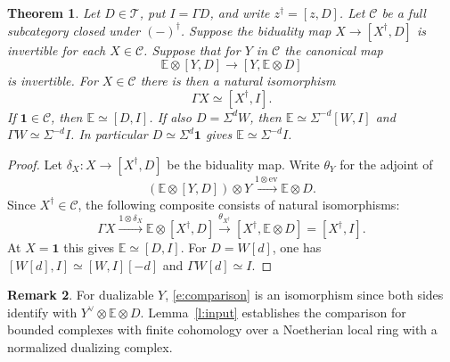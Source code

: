 \documentclass[11pt,reqno]{amsart}
\newtheorem{theorem}{Theorem}[section]
\theoremstyle{definition}
\newtheorem{remark}[theorem]{Remark}
\newcommand{\T}{\mathcal T}
\newcommand{\one}{\mathbf 1}
\numberwithin{equation}{section}
\begin{document}
\begin{theorem}\label{t:duals}
Let $D\in\T$, put $I=\Gamma D$, and write $z^\dagger=[z,D]$. Let $\mathcal C$ be a full subcategory closed under $(-)^\dagger$. Suppose the biduality map $X\to[X^\dagger,D]$ is invertible for each $X\in\mathcal C$. Suppose that for $Y$ in $\mathcal C$ the canonical map
\begin{equation}\label{e:comparison}
 \mathbb{E}\otimes[Y,D]\longrightarrow [Y,\mathbb{E}\otimes D]
\end{equation}
is invertible. For $X\in\mathcal C$ there is then a natural isomorphism
\begin{equation}\label{e:dual}
 \Gamma X\simeq[X^\dagger,I].
\end{equation}
If $\one\in\mathcal C$, then $\mathbb{E}\simeq[D,I]$. If also $D=\Sigma^d W$, then $\mathbb{E}\simeq\Sigma^{-d}[W,I]$ and $\Gamma W\simeq\Sigma^{-d} I$. In particular $D\simeq\Sigma^d\one$ gives $\mathbb{E}\simeq\Sigma^{-d}I$.
\end{theorem}
\begin{proof}
Let $\delta_X:X\to[X^\dagger,D]$ be the biduality map. Write $\theta_Y$ for the adjoint of
\[
 (\mathbb E\otimes[Y,D])\otimes Y
 \xrightarrow{1\otimes\mathrm{ev}}\mathbb E\otimes D.
\]
Since $X^\dagger\in\mathcal C$, the following composite consists of natural isomorphisms:
\[
 \Gamma X\xrightarrow{1\otimes\delta_X}\mathbb E\otimes[X^\dagger,D]
 \xrightarrow{\theta_{X^\dagger}}[X^\dagger,\mathbb E\otimes D]=[X^\dagger,I].
\]
At $X=\one$ this gives $\mathbb E\simeq[D,I]$. For $D=W[d]$, one has $[W[d],I]\simeq[W,I][-d]$ and $\Gamma W[d]\simeq I$.
\end{proof}

\begin{remark}
For dualizable $Y$, \eqref{e:comparison} is an isomorphism since both sides identify with $Y^\vee\otimes \mathbb{E}\otimes D$. Lemma~\ref{l:input} establishes the comparison for bounded complexes with finite cohomology over a Noetherian local ring with a normalized dualizing complex.
\end{remark}
\end{document}
